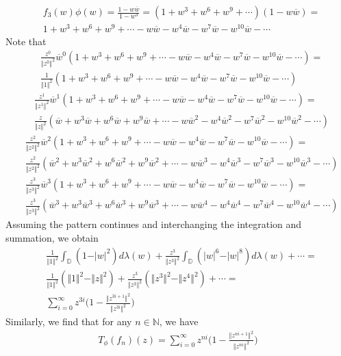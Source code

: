\documentclass[12pt]{article}
\begin{document}
\begin{align}
&f_3(w) \phi(w) = \frac{1-w\overline{w}}{1-w^3} = (1+w^3 + w^6 + w^9 + \cdots)(1 - w\overline{w}) = \\
& 1 + w^3 + w^6 + w^9 + \cdots - w\overline{w} - w^4 \overline{w} - w^7 \overline{w} - w^{10} \overline{w} - \cdots
\end{align} Note that
\begin{align}
&\frac{z^0}{\Vert z^0 \Vert^2} \overline{w}^0 (1 + w^3 + w^6 + w^9 + \cdots - w\overline{w} - w^4 \overline{w} - w^7 \overline{w} - w^{10} \overline{w} - \cdots) = \\
&\frac{1}{\Vert 1 \Vert^2}(1 + w^3 + w^6 + w^9 + \cdots - w\overline{w} - w^4 \overline{w} - w^7 \overline{w} - w^{10} \overline{w} - \cdots)
\end{align}
\begin{align}
&\frac{z^1}{\Vert z^1 \Vert^2} \overline{w}^1 (1 + w^3 + w^6 + w^9 + \cdots - w\overline{w} - w^4 \overline{w} - w^7 \overline{w} - w^{10} \overline{w} - \cdots) = \\
&\frac{z}{\Vert z \Vert^2}(\overline{w} + w^3\overline{w} + w^6\overline{w} + w^9\overline{w} + \cdots - w\overline{w}^2 - w^4 \overline{w}^2 - w^7 \overline{w}^2 - w^{10} \overline{w}^2 - \cdots)
\end{align}
\begin{align}
&\frac{z^2}{\Vert z^2 \Vert^2} \overline{w}^2 (1 + w^3 + w^6 + w^9 + \cdots - w\overline{w} - w^4 \overline{w} - w^7 \overline{w} - w^{10} \overline{w} - \cdots) = \\
&\frac{z^2}{\Vert z^2 \Vert^2}(\overline{w}^2 + w^3\overline{w}^2 + w^6\overline{w}^2 + w^9\overline{w}^2 + \cdots - w\overline{w}^3 - w^4 \overline{w}^3 - w^7 \overline{w}^3 - w^{10} \overline{w}^3 - \cdots)
\end{align}
\begin{align}
&\frac{z^3}{\Vert z^3 \Vert^2} \overline{w}^3 (1 + w^3 + w^6 + w^9 + \cdots - w\overline{w} - w^4 \overline{w} - w^7 \overline{w} - w^{10} \overline{w} - \cdots) = \\
&\frac{z^3}{\Vert z^3 \Vert^2}(\overline{w}^3 + w^3\overline{w}^3 + w^6\overline{w}^3 + w^9\overline{w}^3 + \cdots - w\overline{w}^4 - w^4 \overline{w}^4 - w^7 \overline{w}^4 - w^{10} \overline{w}^4 - \cdots)
\end{align} Assuming the pattern continues and interchanging the integration and summation, we obtain
\begin{align}
&\frac{1}{\Vert 1 \Vert^2} \int_\mathbb{D} (1 - \vert w \vert^2) d\lambda(w) + \frac{z^3}{\Vert z^3 \Vert^2}  \int_\mathbb{D} (\vert w \vert^6 - \vert w \vert^8) d\lambda(w) + \cdots = \\
&\frac{1}{\Vert 1 \Vert^2} (\Vert 1 \Vert^2 - \Vert z \Vert^2) + \frac{z^3}{\Vert z^3 \Vert^2} (\Vert z^3 \Vert^2 - \Vert z^4 \Vert^2) + \cdots = \\
& \sum_{i=0}^\infty z^{3i}\bigg(1 - \frac{\Vert z^{3i+1}\Vert^2}{\Vert z^{3i}\Vert^2}\bigg)
\end{align} Similarly, we find that for any $n \in \mathbb{N}$, we have
\begin{align}
T_\phi(f_n)(z) = \sum_{i=0}^\infty z^{ni} \bigg(1 - \frac{\Vert z^{ni+1}\Vert^2}{\Vert z^{ni}\Vert^2}\bigg) 
\end{align}
\end{document}
